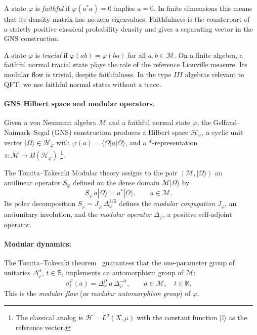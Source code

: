 \documentclass[a4paper,11pt]{article}
\theoremstyle{definition}
\newcommand{\id}{\mathbb{I}}
\begin{document}
A state $\varphi$ is \emph{faithful} if $\varphi(a^*a)=0$ implies $a=0$.
In finite dimensions this means that its density matrix has no zero eigenvalues.
Faithfulness is the counterpart of a strictly positive classical probability density
and gives a separating vector in the GNS construction.

A state $\varphi$ is \emph{tracial} if $\varphi(ab)=\varphi(ba)$ for all $a,b\in\mathcal M$.
On a finite algebra, a faithful normal tracial state plays the role of the reference
Liouville measure. Its modular flow is trivial, despite faithfulness. In the type $III$
algebras relevant to QFT, we use faithful normal states without a trace.

\paragraph{GNS Hilbert space and modular operators.}
Given a von Neumann algebra $\mathcal M$ and a faithful normal state $\varphi$, the
Gelfand--Naimark--Segal (GNS) construction produces a Hilbert space $\mathcal{H}_\varphi$,
a cyclic unit vector $|\Omega\rangle\in\mathcal{H}_\varphi$ with
$\varphi(a)=\langle\Omega|a|\Omega\rangle$, and a $*$-representation
$\pi:\mathcal M\to B(\mathcal{H}_\varphi)$ \footnote{The classical analog is $\mathcal{H}=L^2(X,\mu)$
with the constant function $|\id\rangle$ as the reference vector.}.

The Tomita--Takesaki Modular theory assigns to the pair $(\mathcal M,|\Omega\rangle)$ an
antilinear operator $S_\varphi$ defined on the dense domain
$\mathcal M|\Omega\rangle$ by
\begin{equation}
  S_\varphi\, a|\Omega\rangle = a^*|\Omega\rangle, \qquad a\in\mathcal M.
  \label{eq:Tomita-S}
\end{equation}
Its polar decomposition $S_\varphi = J_\varphi\,\Delta_\varphi^{1/2}$ defines the
\emph{modular conjugation} $J_\varphi$, an antiunitary involution, and the
\emph{modular operator} $\Delta_\varphi$, a positive self-adjoint operator.

\paragraph{Modular dynamics:}
The Tomita--Takesaki theorem~\cite{Takesaki1970} guarantees that the one-parameter group
of unitaries $\Delta_\varphi^{it}$, $t\in\mathbb{R}$, implements an automorphism group of
$\mathcal M$:
\begin{equation}
  \sigma_t^\varphi(a) = \Delta_\varphi^{it}\, a\, \Delta_\varphi^{-it},
  \qquad a\in\mathcal M,\quad t\in\mathbb{R}.
  \label{eq:modular-flow}
\end{equation}
This is the \emph{modular flow} (or \emph{modular automorphism group}) of $\varphi$.
\end{document}
